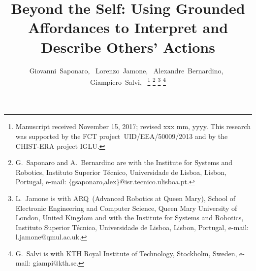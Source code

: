 \documentclass[journal]{IEEEtran}
\newcommand{\hr}{human--robot}
\begin{document}
\title{Beyond the Self: Using Grounded Affordances to Interpret and Describe Others' Actions}

\author{Giovanni~Saponaro,~
        Lorenzo~Jamone,~
        Alexandre~Bernardino,~
        Giampiero~Salvi,~
        \thanks{
          Manuscript received November 15, 2017; revised xxx mm, yyyy. This research was supported by the FCT project~UID/EEA/50009/2013 and by the CHIST-ERA project IGLU.}
\thanks{G.~Saponaro and A.~Bernardino are with the
Institute for Systems and Robotics, Instituto Superior Técnico,
Universidade de Lisboa, Lisbon, Portugal, e-mail: \{gsaponaro,alex\}@isr.tecnico.ulisboa.pt.}
\thanks{L.~Jamone is with ARQ~(Advanced Robotics at Queen Mary), School of Electronic Engineering and Computer Science, Queen Mary University of London, United Kingdom
and with the
Institute for Systems and Robotics, Instituto Superior Técnico, Universidade de Lisboa, Lisbon, Portugal,
e-mail: l.jamone@qmul.ac.uk.}
\thanks{G.~Salvi is with KTH Royal Institute of Technology, Stockholm, Sweden,
  e-mail: giampi@kth.se.}
}

\maketitle
\IEEEpeerreviewmaketitle

\begin{abstract}
  
\end{abstract}
\end{document}
